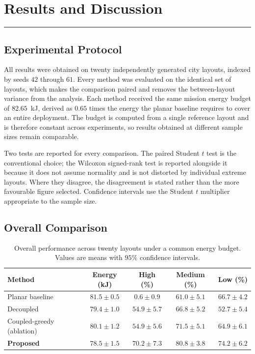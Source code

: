 \chapter{Results and Discussion}
\label{chap:results}
\noindent \rule{6.6in}{0.01in}
\minitoc
\newpage

\section{Experimental Protocol}

All results were obtained on twenty independently generated city layouts, indexed by seeds $42$ through $61$. Every method was evaluated on the identical set of layouts, which makes the comparison paired and removes the between-layout variance from the analysis. Each method received the same mission energy budget of $82.65$~kJ, derived as $0.65$ times the energy the planar baseline requires to cover an entire deployment. The budget is computed from a single reference layout and is therefore constant across experiments, so results obtained at different sample sizes remain comparable.

Two tests are reported for every comparison. The paired Student $t$ test \cite{student1908probable} is the conventional choice; the Wilcoxon signed-rank test \cite{wilcoxon1945individual} is reported alongside it because it does not assume normality and is not distorted by individual extreme layouts. Where they disagree, the disagreement is stated rather than the more favourable figure selected. Confidence intervals use the Student $t$ multiplier appropriate to the sample size.

\section{Overall Comparison}

\begin{table}[!ht]
\centering
\caption[Overall performance across twenty layouts]{Overall performance across twenty layouts under a common energy budget. Values are means with $95\%$ confidence intervals.}
\label{tab:main}
\begin{tabular}{lcccc}
\toprule
\textbf{Method} & \textbf{Energy (kJ)} & \textbf{High (\%)} & \textbf{Medium (\%)} & \textbf{Low (\%)} \\
\midrule
Planar baseline & $81.5 \pm 0.5$ & $0.6 \pm 0.9$ & $61.0 \pm 5.1$ & $66.7 \pm 4.2$ \\
Decoupled & $79.4 \pm 1.0$ & $54.9 \pm 5.7$ & $66.8 \pm 5.2$ & $52.7 \pm 5.4$ \\
Coupled-greedy (ablation) & $80.1 \pm 1.2$ & $54.9 \pm 5.6$ & $71.5 \pm 5.1$ & $64.9 \pm 6.1$ \\
\textbf{Proposed} & $\mathbf{78.5 \pm 1.5}$ & $\mathbf{70.2 \pm 7.3}$ & $\mathbf{80.8 \pm 3.8}$ & $\mathbf{74.2 \pm 6.2}$ \\
\bottomrule
\end{tabular}
\end{table}

